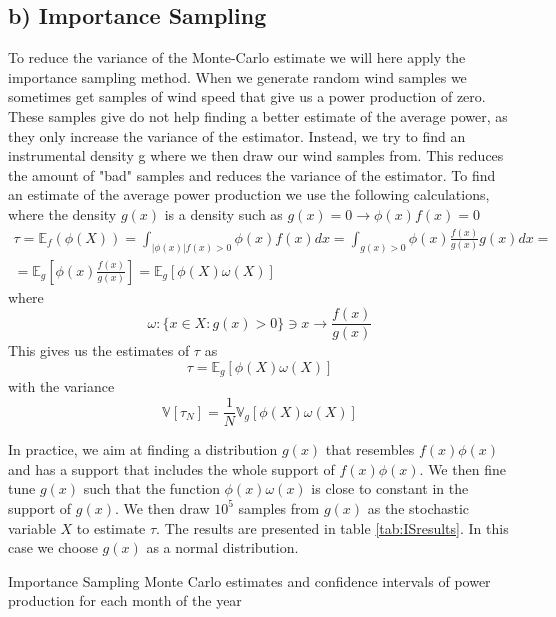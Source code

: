 \documentclass[a4paper]{article}
\begin{document}
\subsection*{b) Importance Sampling}
To reduce the variance of the Monte-Carlo estimate we will here apply the importance sampling method. When we generate random wind samples we sometimes get samples of wind speed that give us a power production of zero. These samples give do not help finding a better estimate of the average power, as they only increase the variance of the estimator. Instead, we try to find an instrumental density g where we then draw our wind samples from. This reduces the amount of "bad" samples and reduces the variance of the estimator. \noindent To find an estimate of the average power production we use the following calculations, where the density $g(x)$ is a density such as $g(x) = 0 \rightarrow \phi(x)f(x) = 0$
\begin{equation}
    \begin{gathered}
        \tau = \mathbb{E}_f(\phi(X)) = \int_{|\phi(x)|f(x)>0}\phi(x)f(x)dx = \int_{g(x)>0}\phi(x)\frac{f(x)}{g(x)}g(x)dx = \\
        = \mathbb{E}_g[\phi(x)\frac{f(x)}{g(x)}] = \mathbb{E}_g[\phi(X)\omega(X)]
    \end{gathered}
\end{equation}
where
\begin{equation}
    \omega : \{x \in X : g(x)>0 \} \ni x \rightarrow \frac{f(x)}{g(x)}
\end{equation}
This gives us the estimates of $\tau$ as
\begin{equation}
    \tau = \mathbb{E}_g[\phi(X)\omega(X)]
\end{equation}
with the variance
\begin{equation}
    \mathbb{V}[\tau_N] = \frac{1}{N}\mathbb{V}_g[\phi(X)\omega(X)]
\end{equation}

In practice, we aim at finding a distribution $g(x)$ that resembles $f(x)\phi(x)$ and has a support that includes the whole support of $f(x)\phi(x)$. We then fine tune $g(x)$ such that the function $\phi(x)\omega(x)$ is close to constant in the support of $g(x)$. We then draw $10^5$ samples from $g(x)$ as the stochastic variable $X$ to estimate $\tau$. The results are presented in table \ref{tab:ISresults}. In this case we choose $g(x)$ as a normal distribution.

\begin{table}[H]
    \centering
    \caption{Importance Sampling Monte Carlo estimates and confidence intervals of power production for each month of the year}
    \label{tab:ISresults}
    
\end{table}
\end{document}

